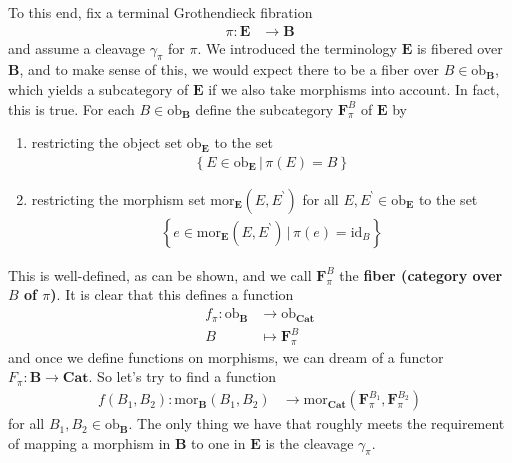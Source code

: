 To this end, fix a terminal Grothendieck fibration
\begin{align*}
  \pi
  \colon
  \mathbf{E}
  &\rightarrow
  \mathbf{B}
\end{align*}
and assume a cleavage $\gamma_{\pi}$ for $\pi$.
We introduced the terminology {\glqq}$\mathbf{E}$ is fibered over $\mathbf{B}${\grqq}, and to make sense of this, we would expect there to be a fiber over $B \in \mathrm{ob}_{\mathbf{B}}$, which yields a subcategory of $\mathbf{E}$ if we also take morphisms into account.
In fact, this is true.
For each $B \in \mathrm{ob}_{\mathbf{B}}$ define the subcategory $\mathbf{F}_{\pi}^{B}$ of $\mathbf{E}$ by
\begin{enumerate}
\item[$\bullet$]
restricting the object set $\mathrm{ob}_{\mathbf{E}}$ to the set
\begin{align*}
  \left\lbrace
      E
      \in
      \mathrm{ob}_{\mathbf{E}}
    \,
    \vert
    \,
      \pi(E)
      =
      B
  \right\rbrace
\end{align*}
\item[$\bullet$]
restricting the morphism set $\mathrm{mor}_{\mathbf{E}}(E,E^{\backprime})$ for all $E,E^{\backprime} \in \mathrm{ob}_{\mathbf{E}}$ to the set
\begin{align*}
  \left\lbrace
      e
      \in
      \mathrm{mor}_{\mathbf{E}}(E,E^{\backprime})
    \,
    \vert
    \,
      \pi(e)
      =
      \mathrm{id}_{B}
  \right\rbrace
\end{align*}
\end{enumerate}
This is well-defined, as can be shown, and we call $\mathbf{F}_{\pi}^{B}$ the \textbf{fiber (category over $B$ of $\pi$)}.
It is clear that this defines a function
\begin{align*}
  f_{\pi}
  \colon
  \mathrm{ob}_{\mathbf{B}}
  &\rightarrow
  \mathrm{ob}_{\mathbf{Cat}}
  \\
  B
  &\mapsto
  \mathbf{F}_{\pi}^{B}
\end{align*}
and once we define functions on morphisms, we can dream of a functor $F_{\pi} \colon \mathbf{B} \rightarrow \mathbf{Cat}$.
So let's try to find a function
\begin{align*}
  f(B_{1},B_{2})
  \colon
  \mathrm{mor}_{\mathbf{B}}(B_{1},B_{2})
  &\rightarrow
  \mathrm{mor}_{\mathbf{Cat}}
  \left(
    \mathbf{F}_{\pi}^{B_{1}},
    \mathbf{F}_{\pi}^{B_{2}}
  \right)
\end{align*}
for all $B_{1},B_{2} \in \mathrm{ob}_{\mathbf{B}}$.
The only thing we have that roughly meets the requirement of mapping a morphism in $\mathbf{B}$ to one in $\mathbf{E}$ is the cleavage $\gamma_{\pi}$.
